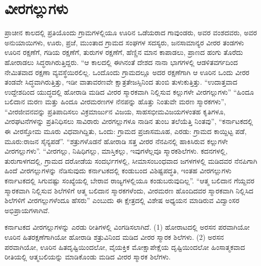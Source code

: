 \newpage

\section{ವೀರಗಲ್ಲುಗಳು}

ಪ್ರಾಚೀನ ಕಾಲದಲ್ಲಿ ಪ್ರತಿಯೊಂದು ಗ್ರಾಮಗಳಲ್ಲಿಯೂ ಊರಿನ ಒಡೆಯರಾದ ಗಾವುಂಡರು, ಅವರ ವಂಶದವರು, ಅವರ ಅನುಯಾಯಿಗಳು, ಊರು, ಪ್ರಜೆ, ಮುಂತಾದ ಗ್ರಾಮದ ಸಂಘಗಳ ಸದಸ್ಯರು, ಜನಸಾಮಾನ್ಯರ ವೀರರ ತಂಡಗಳು ಊರಿನ ರಕ್ಷಣೆಗೆ, ಗಡಿಯ ರಕ್ಷಣೆಗೆ, ತುರುಗಳ ರಕ್ಷಣೆಗೆ, ಹೆಣ್ಣಿನ ಮಾನ ಕಾಪಾಡಲು, ಪ್ರಾಣದ ಹಂಗು ತೊರೆದು ಹೋರಾಡಲು ಸಿದ್ಧರಾಗಿರುತ್ತಿದ್ದರು. “ಆ ಕಾಲದಲ್ಲಿ ಈಗಿನಂತೆ ದೇಶದ ನಾನಾ ಭಾಗಗಳಲ್ಲಿ ಆಡಳಿತವರ್ಗದಿಂದ ನೇಮಿತವಾದ ರಕ್ಷಣಾ ವ್ಯವಸ್ಥೆಯಿರಲಿಲ್ಲ. ಒಂದೊಂದು ಗ್ರಾಮದಲ್ಲೂ ಅದರ ರಕ್ಷಣೆಗಾಗಿ ಆ ಊರಿನ ಒಂದು ವೀರರ ತಂಡವೇ ಸಿದ್ಧವಾಗಿರುತ್ತಿತ್ತು, ಇಡೀ ವಾತಾವರಣವೇ ಕ್ಷಾತ್ರತೇಜಸ್ಸಿನಿಂದ ತುಂಬಿ ತುಳುಕುತ್ತಿತ್ತು. “ಉದಾತ್ತವಾದ ಉದ್ದೇಶದಿಂದ ಯುದ್ಧದಲ್ಲಿ ಹೋರಾಡಿ ಮಡಿದ ವೀರರ ಸ್ಮಾರಕವಾಗಿ ನಿಲ್ಲಿಸುವ ಕಲ್ಲುಗಳೇ ವೀರಗಲ್ಲುಗಳು” “ಹಿಂದೂ ಬಲಿದಾನ ಮರಣ ಮತ್ತು ಹಿಂದೂ ವೀರಮರಣಗಳ ನೆನಪನ್ನು ಹೊತ್ತು ನಿಂತುವೇ ಮರಣ ಸ್ಮಾರಕಗಳು”, “ವೀರಜೀವನವನ್ನು ಪ್ರತಿಪಾದಿಸಲು ವಿಕ್ರಮಾರ್ಜುನ ವಿಜಯ, ಸಾಹಸಭೀಮವಿಜಯಗಳಂತಹ ಕೃತಿಗಳೂ, ವೀರಘಟನೆಗಳನ್ನು ಪ್ರತಿನಿಧಿಸಲು ಸಾವಿರಾರು ವೀರಗಲ್ಲುಗಳೂ ನಾಡಿನ ತುಂಬ ತಲೆಯೆತ್ತಿ ನಿಂತವು”, “ಕರ್ನಾಟಕದಲ್ಲಿ ಈ ವೀರಸ್ತೋಮ ಮೂರು ವಿಧವಾಗಿದ್ದಿತು, ಒಂದು: ಗ್ರಾಮದ ಪ್ರಜಾಸಮೂಹ, ಎರಡು: ಗ್ರಾಮದ ಕಾಯ್ದಿಟ್ಟ ಪಡೆ, ಮೂರು:ರಾಜನ ಸೈನ್ಯಪಡೆ”. “ಶತ್ರುಗಳೊಡನೆ ಹೋರಾಡಿ ಸತ್ತ ವೀರರ ನೆನಪಿನಲ್ಲಿ ಹಾಕಿಸಿರುವ ಕಲ್ಲುಗಳೇ ವೀರಗಲ್ಲುಗಳು”. “ವೀರಗಲ್ಲು, ನಿಷಿಧಿಗಲ್ಲು, ಮಾಸ್ತಿಕಲ್ಲು, ಇವುಗಳೆಲ್ಲವೂ ಸ್ಮಾರಕಶಿಲೆಗಳು. ಕದನಗಳಲ್ಲಿ, ತುರುಗಾಳಗದಲ್ಲಿ, ಗ್ರಾಮದ ದರೋಡೆಯ ಸಂದರ್ಭಗಳಲ್ಲಿ, ಸೀಮಾಸಂಬಂಧವಾದ ಜಗಳಗಳಲ್ಲಿ ಮಡಿದವರ ನೆನಪಿಗಾಗಿ ಹಿಂದೆ ವೀರಗಲ್ಲುಗಳನ್ನು ನೆಡಿಸುವುದು ಕರ್ನಾಟಕದಲ್ಲಿ ಕಂಡುಬಂದ ವಿಶಿಷ್ಟಪದ್ಧತಿ, ಇಂತಹ ವೀರಗಲ್ಲುಗಳು ಕರ್ನಾಟಕದಲ್ಲಿ ಸಿಗುವಷ್ಟು ಸಂಖ್ಯೆಯಲ್ಲಿ ಬೇರಾವ ರಾಜ್ಯಗಳಲ್ಲಿಯೂ ಕಂಡುಬರುವುದಿಲ್ಲ”. “ಆತ್ಮ ಬಲಿದಾನ ಗೆಯ್ದವರ ಸ್ಮಾರಕವಾಗಿ ನಿಲ್ಲಿಸುವ ಶಿಲೆಗಳಿಗೆ ಆತ್ಮ ಬಲಿದಾನ ಸ್ಮಾರಕಗಳೆಂದು, ವೀರಮರಣ ಹೊಂದಿದವರ ಸ್ಮಾರಕವಾಗಿ ನಿಲ್ಲಿಸಿದ ಶಿಲೆಗಳಿಗೆ ವೀರಗಲ್ಲುಗಳೆಂದೂ ಹೆಸರು” ಎಂಬುದು ಈ ಕ್ಷೇತ್ರದಲ್ಲಿ ವಿಶೇಷ ಅಧ್ಯಯನ ಮಾಡಿರುವ ವಿದ್ವಾಂಸರ ಅಭಿಪ್ರಾಯಗಳಾಗಿವೆ.

ಕರ್ನಾಟಕದ ವೀರಗಲ್ಲುಗಳನ್ನು ಎರಡು ರೀತಿಗಳಲ್ಲಿ ವಿಂಗಡಿಸಲಾಗಿದೆ. (1) ಹೋರಾಟದಲ್ಲಿ ಅರಸನ ಪರವಾಗಿಯೋ ಊರಿನ ಹಿತರಕ್ಷಣೆಗಾಗಿಯೋ ಹೋರಾಡಿ ಶತ್ರುವಿನಿಂದ ಮಡಿದ ವೀರರ ಸ್ಮಾರಕ ಶಿಲೆಗಳು. (2) ಅರಸನ ಪರವಾಗಿಯೋ, ಊರಿನ ಹಿತದೃಷ್ಟಿಯಿಂದಲೋ, ವೈಯಕ್ತಿಕ ಮೋಕ್ಷಾಪೇಕ್ಷೆಯ ದೃಷ್ಟಿಯಿಂದಲೋ ಹಿಂಸಾತ್ಮಕವಾದ ರೀತಿಯಲ್ಲಿ ಆತ್ಮಬಲಿಯನ್ನು ಮಾಡಿಕೊಂಡು ಮಡಿದ ವೀರರ ಸ್ಮಾರಕ ಶಿಲೆಗಳು.

